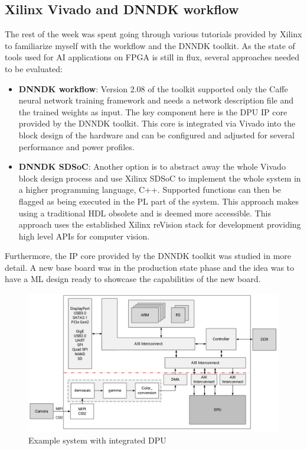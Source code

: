\subsection{Xilinx Vivado and \acs{DNNDK} workflow}
The rest of the week was spent going through various tutorials provided by Xilinx to familiarize myself with the workflow and the \ac{DNNDK} toolkit. As the state of tools used for \ac{AI} applications on \ac{FPGA} is still in flux, several approaches needed to be evaluated:
\begin{itemize}
	\item \textbf{\ac{DNNDK} workflow}: Version 2.08 of the toolkit supported only the Caffe neural network training framework and needs a network description file and the trained weights as input. The key component here is the \ac{DPU} \ac{IP} core provided by the \ac{DNNDK} toolkit. This core is integrated via Vivado into the block design of the hardware and can be configured and adjusted for several performance and power profiles.
	\item \textbf{\ac{DNNDK} \ac{SDSoC}}: Another option is to abstract away the whole Vivado block design process and use Xilinx \ac{SDSoC} to implement the whole system in a higher programming language, C++. Supported functions can then be flagged as being executed in the \ac{PL} part of the system. This approach makes using a traditional \ac{HDL} obsolete and is deemed more accessible. This approach uses the established Xilinx reVision stack for development providing high level \acp{API} for computer vision.
\end{itemize}
Furthermore, the \ac{IP} core provided by the \ac{DNNDK} toolkit was studied in more detail. A new base board was in the production state phase and the idea was to have a \ac{ML} design ready to showcase the capabilities of the new board.
\begin{figure}[!htb]
	\centering
		\includegraphics[width=\textwidth]{bilder/DPU_example_design.png}
		\caption{Example system with integrated \acs{DPU} \cite[p.~8]{dpu}}
		\label{fig:dpu_example}
\end{figure}
